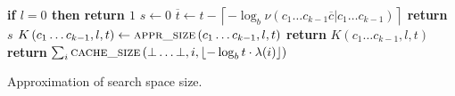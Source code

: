 \documentclass[a4paper,twocolumn]{article}
\newenvironment{lyxcode}
{\par\begin{list}{}{
\setlength{\rightmargin}{\leftmargin}
\setlength{\listparindent}{0pt}\raggedright
\setlength{\itemsep}{0pt}
\setlength{\parsep}{0pt}
\normalfont\ttfamily}\item[]}
{\end{list}}
\begin{document}
\begin{algorithm}
\begin{algorithmic}
\State {}
\State \textbf{if $l=0$ then return $1$}
\State $s\gets 0$
\State $\overline t \gets t - \left\lceil-\log_b\nu\left(\left.c_1\ldots c_{k-1} \overline c \right| c_1\ldots c_{k-1}\right)\right\rceil$
\EndIf
\EndFor
\State \textbf{return} $s$
\EndFunction
\State
{}
\State {}
\State $K\left(c_1\ldots c_{k-1}, l, t\right) \gets \textsc{appr\_size}\left(c_1\ldots c_{k-1}, l, t\right)$
\EndIf
\State \textbf{return} $K\left(c_1\ldots c_{k-1}, l, t\right)$
\EndFunction
\State
{} 
\State \textbf{return} $\sum_i  \textsc{cache\_size}\left(\bot\ldots\bot, i, \left\lfloor-\log_b t\cdot \lambda(i)\right\rfloor\right)$
\EndFunction
\end{algorithmic}

\begin{comment}
\begin{lyxcode}
def~approxsize(state,~length,~l):

~~~~if~length~==~0:

~~~~~~~~return~1

~~~~s~=~0

~~~~for~c~in~chars:

~~~~~~~~newl~=~l~-~floor(-log(nu(state~+~c,

~~~~~~~~~~~~~~~~~~~~~~~~~~~~~~~~~state),~b))

~~~~~~~~if~newl~>=~0:

~~~~~~~~~~~~s~+=~approxsize(state{[}1:{]}~+~c,

~~~~~~~~~~~~~~~~~~~~~~~~~~~~length~-~1,

~~~~~~~~~~~~~~~~~~~~~~~~~~~~newl)

~~~~return~s
\end{lyxcode}

\end{comment}
{}

\caption{\label{alg:Implicit-approximation-of}Approximation of search space
size.}

\end{algorithm}
\end{document}

